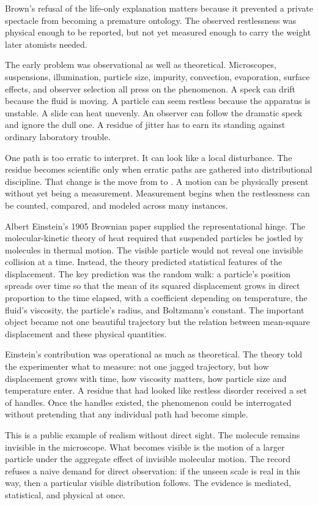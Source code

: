 Brown's refusal of the life-only explanation matters because it prevented
a private spectacle from becoming a premature ontology. The observed
restlessness was physical enough to be reported, but not yet measured
enough to carry the weight later atomists needed.

The early problem was observational as well as theoretical. Microscopes,
suspensions, illumination, particle size, impurity, convection,
evaporation, surface effects, and observer selection all press on the
phenomenon. A speck can drift because the fluid is moving. A particle can
seem restless because the apparatus is unstable. A slide can heat
unevenly. An observer can follow the dramatic speck and ignore the dull
one. A residue of jitter has to earn its standing against ordinary
laboratory trouble.

One path is too erratic to interpret. It can look like a local disturbance. The
residue becomes scientific only when erratic paths are gathered into
distributional discipline. That change is the move from 
to . A motion can be physically present without yet
being a measurement. Measurement begins when the restlessness can be
counted, compared, and modeled across many instances.

Albert Einstein's 1905 Brownian paper supplied the representational
hinge. The molecular-kinetic theory of heat required that suspended
particles be jostled by molecules in thermal motion. The visible particle
would not reveal one invisible collision at a time. Instead, the theory
predicted statistical features of the displacement. The key prediction
was the random walk: a particle's position spreads over time so that the
mean of its squared displacement grows in direct proportion to the time
elapsed, with a coefficient depending on temperature, the fluid's
viscosity, the particle's radius, and Boltzmann's constant. The
important object became not one beautiful trajectory but the relation
between mean-square displacement and these physical quantities.

Einstein's contribution was operational as much as theoretical. The
theory told the experimenter what to measure: not one jagged trajectory,
but how displacement grows with time, how viscosity matters, how particle
size and temperature enter. A residue that had looked like restless
disorder received a set of handles. Once the handles existed, the
phenomenon could be interrogated without pretending that any individual
path had become simple.

This is a public example of realism without direct sight. The molecule
remains invisible in the microscope. What becomes visible is the motion
of a larger particle under the aggregate effect of invisible molecular
motion. The record refuses a naive demand for direct observation: if the
unseen scale is real in this way, then a particular visible distribution
follows. The evidence is mediated, statistical, and physical at once.

